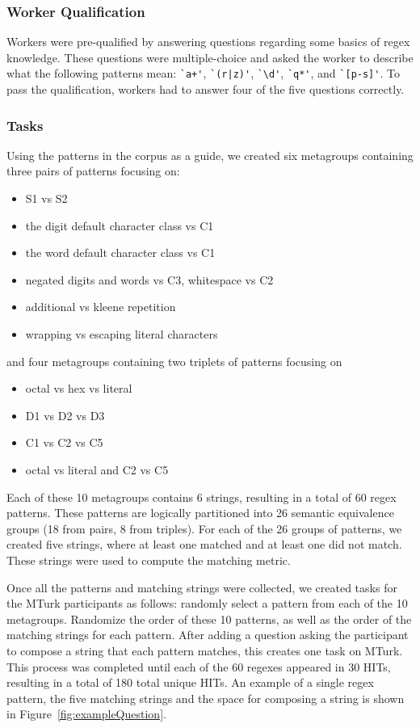 \subsubsection{Worker Qualification}
Workers were pre-qualified by answering questions regarding some basics of regex knowledge. These questions were multiple-choice and asked the worker to describe what the following patterns mean: \verb!`a+'!, \verb!`(r|z)'!, \verb!`\d'!, \verb!`q*'!, and \verb!`[p-s]'!. To pass the qualification, workers had to answer four of the five questions correctly.

\subsubsection{Tasks}
Using the patterns in the corpus as a guide, we created six metagroups containing three pairs of patterns focusing on:
\begin{itemize}
\item S1 vs S2
\item the digit default character class vs C1
\item the word default character class vs C1
\item negated digits and words vs C3, whitespace vs C2
\item additional vs kleene repetition
\item wrapping vs escaping literal characters
\end{itemize}
and four metagroups containing two triplets of patterns focusing on
\begin{itemize}
\item octal vs hex vs literal
\item D1 vs D2 vs D3
\item C1 vs C2 vs C5
\item octal vs literal and C2 vs C5
\end{itemize}

Each of these 10 metagroups contains 6 strings, resulting in a total of 60 regex patterns.  These patterns are logically partitioned into 26 semantic equivalence groups (18 from pairs, 8 from triples). For each of the 26 groups of patterns, we created five strings, where at least one matched and at least one did not match. These strings were used to compute the matching metric.

Once all the patterns and matching strings were collected, we created tasks for the MTurk participants as follows:
randomly select a pattern from each of the 10 metagroups. Randomize the order of these 10 patterns, as well as the order of the matching strings for each pattern. After adding a question asking the participant to compose a string that each pattern matches, this creates one task on MTurk.   This process was completed until each of the 60 regexes appeared in 30 HITs, resulting in a total of 180 total unique HITs.
An example of a single regex pattern, the five matching strings and the space for composing a string is shown in Figure~\ref{fig:exampleQuestion}.


